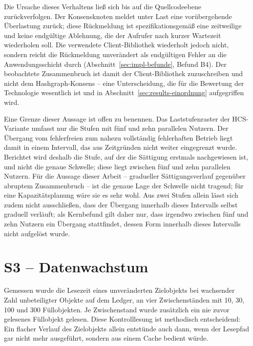 Die Ursache dieses Verhaltens ließ sich bis auf die Quellcodeebene zurückverfolgen. Der Konsensknoten meldet unter Last eine vorübergehende Überlastung zurück; diese Rückmeldung ist spezifikationsgemäß eine zeitweilige und keine endgültige Ablehnung, die der Aufrufer nach kurzer Wartezeit wiederholen soll. Die verwendete Client-Bibliothek wiederholt jedoch nicht, sondern reicht die Rückmeldung unverändert als endgültigen Fehler an die Anwendungsschicht durch (Abschnitt~\ref{sec:impl-befunde}, Befund B4). Der beobachtete Zusammenbruch ist damit der Client-Bibliothek zuzuschreiben und nicht dem Hashgraph-Konsens -- eine Unterscheidung, die für die Bewertung der Technologie wesentlich ist und in Abschnitt~\ref{sec:results-einordnung} aufgegriffen wird.

Eine Grenze dieser Aussage ist offen zu benennen. Das Laststufenraster der HCS-Variante umfasst nur die Stufen mit fünf und zehn parallelen Nutzern. Der Übergang vom fehlerfreien zum nahezu vollständig fehlerhaften Betrieb liegt damit in einem Intervall, das aus Zeitgründen nicht weiter eingegrenzt wurde. Berichtet wird deshalb die Stufe, auf der die Sättigung erstmals nachgewiesen ist, und nicht die genaue Schwelle; diese liegt zwischen fünf und zehn parallelen Nutzern. Für die Aussage dieser Arbeit -- gradueller Sättigungsverlauf gegenüber abruptem Zusammenbruch -- ist die genaue Lage der Schwelle nicht tragend; für eine Kapazitätsplanung wäre sie es sehr wohl. Aus zwei Stufen allein lässt sich zudem nicht ausschließen, dass der Übergang innerhalb dieses Intervalls selbst graduell verläuft; als Kernbefund gilt daher nur, dass irgendwo zwischen fünf und zehn Nutzern ein Übergang stattfindet, dessen Form innerhalb dieses Intervalls nicht aufgelöst wurde.



\section{S3 -- Datenwachstum}
\label{sec:results-s3}

Gemessen wurde die Lesezeit eines unveränderten Zielobjekts bei wachsender Zahl unbeteiligter Objekte auf dem Ledger, an vier Zwischenständen mit 10, 30, 100 und 300 Füllobjekten. Je Zwischenstand wurde zusätzlich ein nie zuvor gelesenes Füllobjekt gelesen. Diese Kontrolllesung ist methodisch entscheidend: Ein flacher Verlauf des Zielobjekts allein entstünde auch dann, wenn der Lesepfad gar nicht mehr ausgeführt, sondern aus einem Cache bedient würde.

